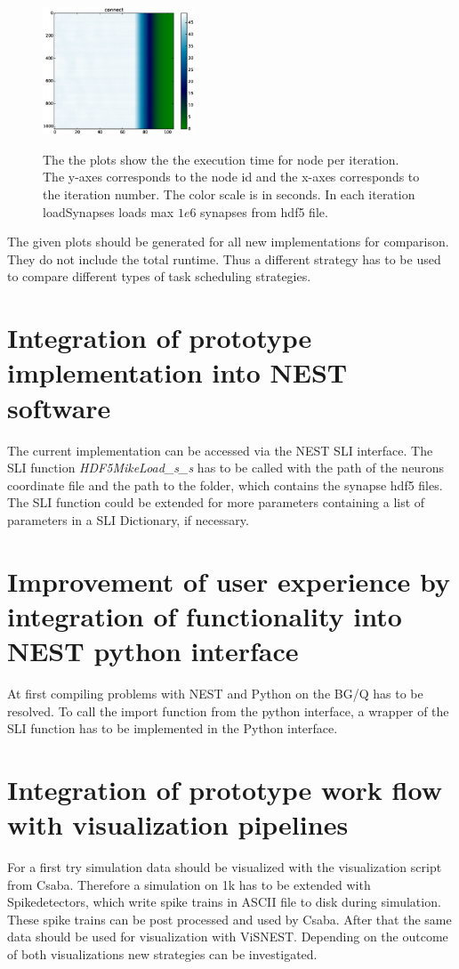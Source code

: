 \documentclass[a4paper]{article}
\begin{document}
\begin{figure}[ht!]
\begin{center}
{            \label{fig:fourth}
            \includegraphics[width=0.4\textwidth]{V03_connect.eps}
        }
    \end{center}
    \caption{%
        The the plots show the the execution time for node per iteration.
        The y-axes corresponds to the node id and the x-axes corresponds to the iteration number.
        The color scale is in seconds.
        In each iteration loadSynapses loads max $1e6$ synapses from hdf5 file.
     }%
   \label{fig:implV03}
\end{figure}
The given plots should be generated for all new implementations for comparison.
They do not include the total runtime.
Thus a different strategy has to be used to compare different types of task scheduling strategies.


\section{Integration of prototype implementation into NEST software}
The current implementation can be accessed via the NEST SLI interface.
The SLI function \emph{HDF5MikeLoad\_s\_s} has to be called with the path of the neurons coordinate file and the path to the folder, which contains the synapse hdf5 files. The SLI function could be extended for more parameters containing a list of parameters in a SLI Dictionary, if necessary.

\section{Improvement of user experience by integration of functionality into NEST python interface}
At first compiling problems with NEST and Python on the BG/Q has to be resolved.
To call the import function from the python interface, a wrapper of the SLI function has to be implemented in the Python interface.
\section{Integration of prototype work flow with visualization pipelines}
For a first try simulation data should be visualized with the visualization script from Csaba.
Therefore a simulation on 1k has to be extended with Spikedetectors, which write spike trains in ASCII file to disk during simulation.
These spike trains can be post processed and used by Csaba.
After that the same data should be used for visualization with ViSNEST.
Depending on the outcome of both visualizations new strategies can be investigated.  
\end{document}
